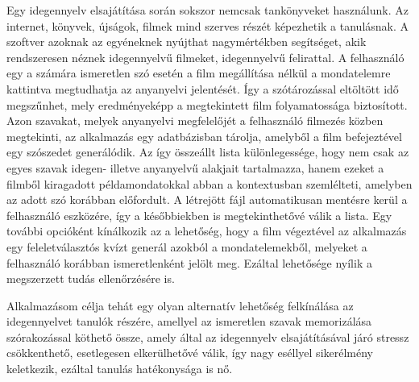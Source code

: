 Egy idegennyelv elsajátítása során sokszor nemcsak tankönyveket használunk. Az internet, könyvek, újságok, filmek mind szerves részét képezhetik a tanulásnak. A szoftver azoknak az egyéneknek nyújthat nagymértékben segítséget, akik rendszeresen néznek idegennyelvű filmeket, idegennyelvű felirattal. A felhasználó egy a számára ismeretlen szó esetén a film megállítása nélkül a mondatelemre kattintva megtudhatja az anyanyelvi jelentését. Így a szótározással eltöltött idő megszűnhet, mely eredményeképp a megtekintett film folyamatossága biztosított. Azon szavakat, melyek anyanyelvi megfelelőjét a felhasználó filmezés közben megtekinti, az alkalmazás egy adatbázisban tárolja, amelyből a film befejeztével egy szószedet generálódik. Az így összeállt lista különlegessége, hogy nem csak az egyes szavak idegen- illetve anyanyelvű alakjait tartalmazza, hanem ezeket a filmből kiragadott példamondatokkal abban a kontextusban szemlélteti, amelyben az adott szó korábban előfordult. A létrejött fájl automatikusan mentésre kerül a felhasználó eszközére, így a későbbiekben is megtekinthetővé válik a lista. Egy további opcióként kínálkozik az a lehetőség, hogy a film végeztével az alkalmazás egy feleletválasztós kvízt generál azokból a mondatelemekből, melyeket a felhasználó korábban ismeretlenként jelölt meg. Ezáltal lehetősége nyílik a megszerzett tudás ellenőrzésére is.

Alkalmazásom célja tehát egy olyan alternatív lehetőség felkínálása az idegennyelvet tanulók részére, amellyel az ismeretlen szavak memorizálása szórakozással köthető össze, amely által az idegennyelv elsajátításával járó stressz csökkenthető, esetlegesen elkerülhetővé válik, így nagy eséllyel sikerélmény keletkezik, ezáltal tanulás hatékonysága is nő.
